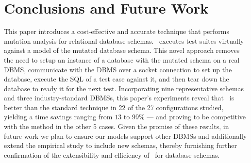 
\section{Conclusions and Future Work}
\label{sec:conclusions}


This paper introduces a cost-effective and accurate technique that performs mutation analysis for relational database schemas. \Vma~executes test suites virtually against a model of the mutated database schema. This novel approach removes the need to setup an instance of a database with the mutated schema on a real DBMS, communicate with the DBMS over a socket connection to set up the database, execute the SQL \INSERTs of a test case against it, and then tear down the database to ready it for the next test. Incorporating nine representative schemas and three industry-standard DBMSs, this paper's experiments reveal that \vma~is better than the standard technique in 22 of the 27 configurations studied, yielding a time savings ranging from $13$ to $99\%$ --- and proving to be competitive with the \Original method in the other 5 cases.  Given the promise of these results, in future work we plan to ensure our models support other DBMSs and additionally extend the empirical study to include new schemas, thereby furnishing further confirmation of the extensibility and efficiency of \vma~for database schemas.

